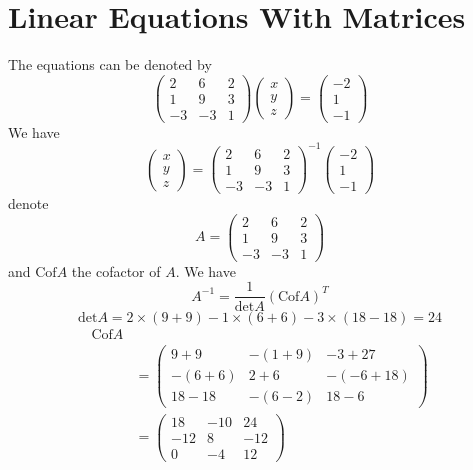 \documentclass[10pt,twocolumn,twoside,a4paper]{article}
\begin{document}
\section*{Linear Equations With Matrices}
The equations can be denoted by
\[
\left(
\begin{array}{ccc}
2&6&2\\
1&9&3\\
-3&-3&1
\end{array}
\right)
\left(
\begin{array}{c}
x\\
y\\
z
\end{array}
\right)
=\left(
\begin{array}{c}
-2\\
1\\
-1
\end{array}
\right)
\]
We have
\[
\left(
\begin{array}{c}
x\\
y\\
z
\end{array}
\right)=\left(
\begin{array}{ccc}
2&6&2\\
1&9&3\\
-3&-3&1
\end{array}
\right)^{-1}\left(
\begin{array}{c}
-2\\
1\\
-1
\end{array}
\right)
\]
denote
\[
A=\left(
\begin{array}{ccc}
2&6&2\\
1&9&3\\
-3&-3&1
\end{array}
\right)
\]
and $\text{Cof}A$ the cofactor of $A$. We have
\[
A^{-1}=\frac{1}{\text{det}A}(\text{Cof}A)^T
\]
\[
\text{det}A=2\times(9+9)-1\times(6+6)-3\times(18-18)=24
\]
\begin{align*}
\text{Cof}A\\
&=\left(
\begin{array}{ccc}
9+9&-(1+9)&-3+27\\
-(6+6)&2+6&-(-6+18)\\
18-18&-(6-2)&18-6
\end{array}
\right)\\
&=\left(
\begin{array}{ccc}
18&-10&24\\
-12&8&-12\\
0&-4&12
\end{array}
\right)
\end{align*}
\end{document}
